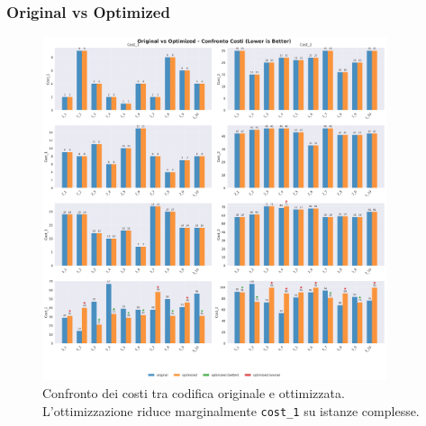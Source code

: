 \documentclass[11pt,a4paper]{article}
\begin{document}
\subsubsection{Original vs Optimized}
\begin{figure}[H]
  \centering
  \includegraphics[width=0.9\textwidth]{../Results/graphs/cost_comparison_original_vs_optimized.png}
  \caption{Confronto dei costi tra codifica originale e ottimizzata. 
  L’ottimizzazione riduce marginalmente \texttt{cost\_1} su istanze complesse.}
\end{figure}
\end{document}
